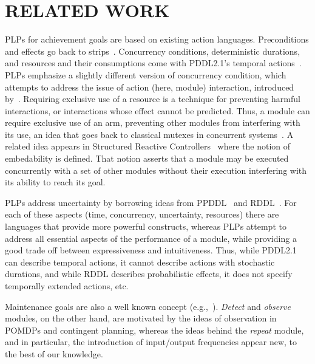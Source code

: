 \documentclass[ 5p, 12pt, times, twocolumn, sort&compress ]{elsarticle}
\begin{document}
\section{RELATED WORK}
PLPs for achievement goals are based on existing action languages. %
Preconditions and effects go back to {\sc strips}~\cite{fikes:nilsson:ai-71}. 
Concurrency conditions, deterministic durations, and resources and their consumptions come with
PDDL2.1's temporal actions~\cite{PDDL2.1}. 
PLPs emphasize a slightly different version of concurrency condition, which attempts to address the issue of
action (here, module) interaction, introduced by~\cite{BB00}. Requiring exclusive use of a resource is 
a technique for preventing harmful interactions, or interactions whose effect cannot be predicted.
Thus, a module can require exclusive use of an arm, preventing other modules from interfering with its use,
an idea that goes back to classical mutexes in concurrent systems~\cite{Mutex}.
A related idea appears in Structured Reactive Controllers~\cite{Beetz99} where the notion of embedability is defined. 
That notion asserts that a module may be executed concurrently with a set of other modules 
without their execution interfering with its ability to reach its goal. 

PLPs address uncertainty by borrowing ideas from
PPDDL~\cite{YouLit04} and RDDL~\cite{RDDL}. For each of these aspects (time, concurrency, uncertainty, resources) there are languages that provide more powerful constructs, whereas PLPs attempt to address all essential aspects of the performance of a module, while providing a good trade off between expressiveness and intuitiveness. Thus,
while PDDL2.1 can describe temporal actions, it cannot describe actions with stochastic durations, and while
RDDL describes probabilistic effects, it does not specify temporally extended actions, etc.

Maintenance goals are also a well known concept (e.g.,~\cite{PRS}). 
{\em Detect\/} and {\em observe\/} modules, on the other hand, are motivated by the ideas of observation in POMDPs and contingent planning, whereas the ideas behind the {\em repeat\/} module, and in particular, the introduction of
input/output frequencies appear new, to the best of our knowledge.
\end{document}
